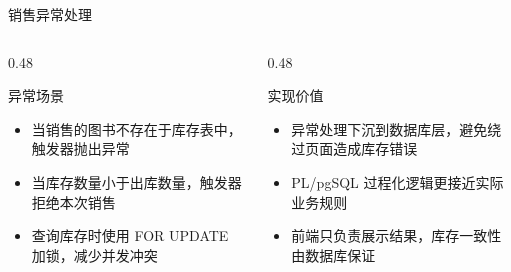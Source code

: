 \documentclass{beamer}
\newcommand{\smallitems}{\setlength{\itemsep}{0.18em}\footnotesize}
\newcommand{\code}[1]{{\ttfamily\small #1}}
\begin{document}
\begin{frame}{销售异常处理}
  \begin{columns}[T,onlytextwidth]
    \begin{column}{0.48\textwidth}
      \begin{block}{异常场景}
        \smallitems
        \begin{itemize}
          \item 当销售的图书不存在于库存表中，触发器抛出异常
          \item 当库存数量小于出库数量，触发器拒绝本次销售
          \item 查询库存时使用 \code{FOR UPDATE} 加锁，减少并发冲突
        \end{itemize}
      \end{block}
    \end{column}
    \begin{column}{0.48\textwidth}
      \begin{block}{实现价值}
        \smallitems
        \begin{itemize}
          \item 异常处理下沉到数据库层，避免绕过页面造成库存错误
          \item PL/pgSQL 过程化逻辑更接近实际业务规则
          \item 前端只负责展示结果，库存一致性由数据库保证
        \end{itemize}
      \end{block}
    \end{column}
  \end{columns}
\end{frame}
\end{document}
